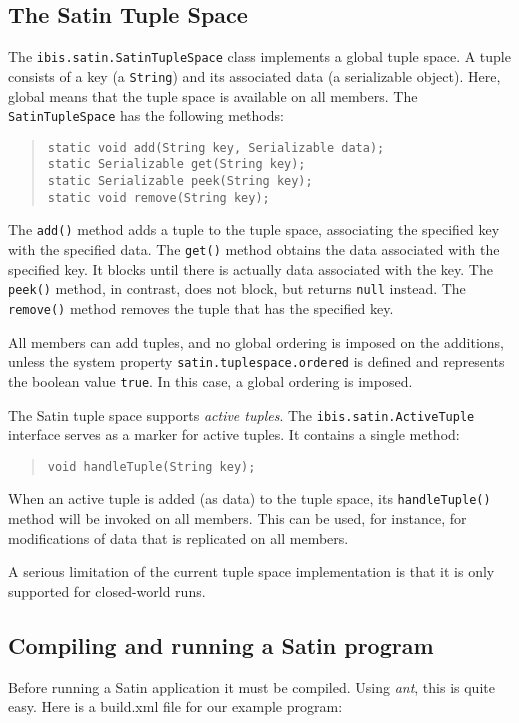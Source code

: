 \documentclass[10pt]{article}
\newcommand{\mysubsection}[1]{\subsection{#1}\label{#1}}
\begin{document}
\mysubsection{The Satin Tuple Space}

The \texttt{ibis.satin.SatinTupleSpace} class implements a global tuple
space.  A tuple consists of a key (a \texttt{String}) and its associated
data (a serializable object). Here, global means that the tuple space is
available on all members. The \texttt{SatinTupleSpace} has the following
methods:

\begin{quote}
\begin{verbatim}
static void add(String key, Serializable data);
static Serializable get(String key);
static Serializable peek(String key);
static void remove(String key);
\end{verbatim}
\end{quote}

The \texttt{add()} method adds a tuple to the tuple space, associating the
specified key with the specified data.
The \texttt{get()} method obtains the data associated with the specified key.
It blocks until there is actually data associated with the key.
The \texttt{peek()} method, in contrast, does not block, but returns
\texttt{null} instead.
The \texttt{remove()} method removes the tuple that has the specified key.

All members can add tuples, and no global ordering is imposed on the
additions, unless the system property
\texttt{satin.tuplespace.ordered} is defined and represents the
boolean value \texttt{true}. In this case, a global ordering is imposed.

The Satin tuple space supports \emph{active tuples}.
The \texttt{ibis.satin.ActiveTuple} interface serves
as a marker for active tuples. It contains a single method:

\begin{quote}
\begin{verbatim}
void handleTuple(String key);
\end{verbatim}
\end{quote}

When an active tuple is added (as data) to the tuple space,
its \texttt{handleTuple()} method will be invoked on all members.
This can be used, for instance, for modifications of data that
is replicated on all members.

A serious limitation of the current tuple space implementation is that
it is only supported for closed-world runs.

\mysubsection{Compiling and running a Satin program}

Before running a Satin application it must be compiled.
Using \emph{ant}, this is quite easy. Here is a build.xml file for
our example program:
\end{document}
